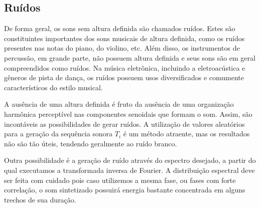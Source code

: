 \subsection{Ruídos}
De forma geral, os sons sem altura definida 
são chamados ruídos.\cite{Lacerda}
Estes são constituintes importantes dos sons musicais de altura definida,
como os ruídos presentes nas notas do piano, do violino, etc. Além disso, os instrumentos
de percussão, em grande parte, não possuem altura definida e seus sons
são em geral compreendidos como ruídos.\cite{Roederer} Na música eletrônica, incluindo
a eletroacústica e gêneros de pista de dança, os ruídos possuem usos diversificados e comumente
característicos do estilo musical.\cite{Cook}

A ausência de uma altura definida é fruto da ausência de uma organização harmônica perceptível nas componentes senoidais que formam o som. Assim,
são incontáveis as possibilidades de gerar ruídos.
A utilização
de valores aleatórios para a geração da sequência sonora $T_i$
é um método atraente,
mas os resultados não são tão úteis, tendendo geralmente ao ruído branco.\cite{Cook}

Outra possibilidade é a geração de ruído através do espectro desejado, a partir
do qual executamos a transformada inversa de Fourier.
A distribuição espectral deve ser feita com cuidado 
pois caso utilizemos a mesma fase,
ou fases com forte correlação, 
o som sintetizado possuirá energia bastante concentrada
em alguns trechos de sua duração.


